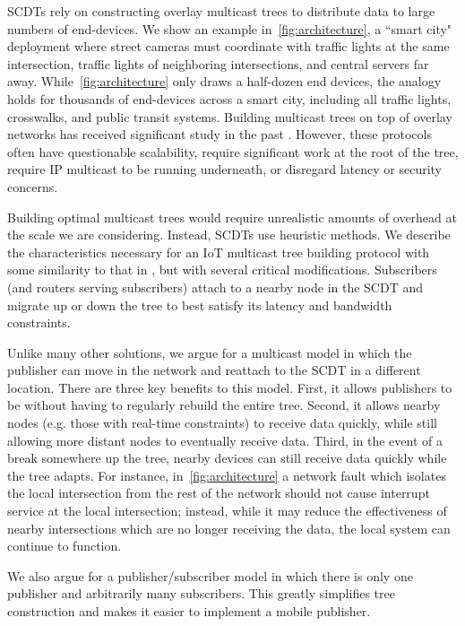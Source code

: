 SCDTs rely on constructing overlay multicast trees to distribute data to
large numbers of end-devices.  We show an example in~\autoref{fig:architecture}, a 
``smart city" \cite{smart-city}
deployment where street cameras must coordinate with traffic lights at the same
intersection, traffic lights of neighboring intersections, and central servers
far away.  While~\autoref{fig:architecture} only draws a half-dozen end devices, 
the analogy holds
for thousands of end-devices across a smart city, including all traffic lights,
crosswalks, and public transit systems.  Building multicast trees on top of
overlay networks has received significant study in the past \cite{overcast,
	scribe, RFC3208}.  However, these protocols often have questionable scalability, require significant work at the root of the tree, require IP multicast to be running underneath, or disregard latency or security concerns.

Building optimal multicast trees would require unrealistic amounts of overhead
at the scale we are considering.  Instead, SCDTs use heuristic methods.  We describe the characteristics necessary for an IoT
multicast tree building protocol with some similarity to that in
\cite{overcast}, but with several critical modifications.  Subscribers (and
routers serving subscribers) attach to a nearby node in the SCDT and
migrate up or down the tree to best satisfy its latency and bandwidth
constraints.

Unlike many other solutions, we argue for a multicast model in which the
publisher can move in the network and reattach to the SCDT in a different
location.  There are three key benefits to this model.  First, it allows
publishers to be  without having to regularly rebuild the entire tree.
Second, it allows nearby nodes (e.g. those with real-time constraints) to
receive data quickly, while still allowing more distant nodes to eventually
receive data.  Third, in the event of a break somewhere up the tree, nearby
devices can still receive data quickly while the tree adapts.  For instance, 
in~\autoref{fig:architecture} a network fault which isolates the local 
intersection from the rest of
the network should not cause interrupt service at the local intersection; instead, while
it may reduce the effectiveness of nearby intersections which are no longer
receiving the data, the local system can continue to function.

We also argue for a publisher/subscriber model in which there is only one
publisher and arbitrarily many subscribers. This greatly simplifies tree
construction and makes it easier to implement a mobile publisher.

